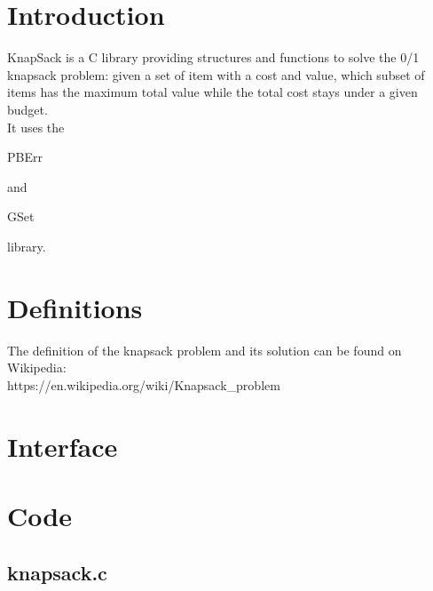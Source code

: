 \section*{Introduction}

KnapSack is a C library providing structures and functions to solve the 0/1 knapsack problem: given a set of item with a cost and value, which subset of items has the maximum total value while the total cost stays under a given budget.\\ 

It uses the \begin{ttfamily}PBErr\end{ttfamily} and \begin{ttfamily}GSet\end{ttfamily} library.\\

\section{Definitions}

The definition of the knapsack problem and its solution can be found on Wikipedia:\\
https://en.wikipedia.org/wiki/Knapsack\_problem

\section{Interface}

\begin{scriptsize}
\begin{ttfamily}

\end{ttfamily}
\end{scriptsize}

\section{Code}

\subsection{knapsack.c}

\begin{scriptsize}
\begin{ttfamily}

\end{ttfamily}
\end{scriptsize}

